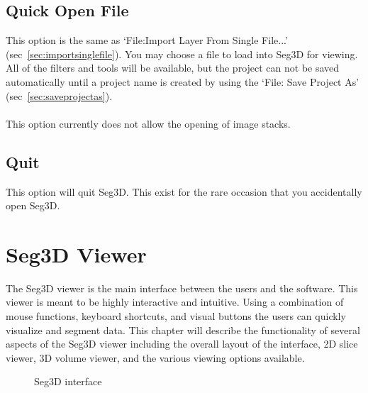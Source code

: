 \documentclass[fleqn,11pt,openany]{book}
\begin{document}
\section{Quick Open File}

This option is the same as `File:Import Layer From Single File...' (sec~\ref{sec:importsinglefile}).  You may choose a file to load into Seg3D for viewing.  All of the filters and tools will be available, but the project can not be saved automatically until a project name is created by using the `File: Save Project As' (sec~\ref{sec:saveprojectas}). 
\\
\\
This option currently does not allow the opening of image stacks.

\section{Quit}

This option will quit Seg3D.  This exist for the rare occasion that you accidentally open Seg3D.  



\chapter{Seg3D Viewer}
\label{sec:viewer}

\begin{introduction}
The Seg3D viewer is the main interface between the users and the software.  This viewer is meant to be highly interactive and intuitive.  Using a combination of mouse functions, keyboard shortcuts, and visual buttons the users can quickly visualize and segment data.  This chapter will describe the functionality of several aspects of the Seg3D viewer including the overall layout of the interface, 2D slice viewer, 3D volume viewer, and the various viewing options available.
\end{introduction}



\begin{figure}[h!]
\caption{Seg3D interface}\label{fig:blank}
\end{figure}
\end{document}
